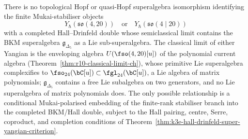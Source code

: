 \begin{proposition}
\label{prop:k3yang-mukai-super-yangian-not-bkm-double}
There is no topological Hopf or quasi-Hopf superalgebra isomorphism
identifying the finite Mukai-stabiliser objects
\[
 Y_\hbar(\mathfrak{so}(4,20))
 \quad\text{or}\quad
 Y_\hbar(\mathfrak{so}(4 \mid 20))
\]
with a completed Hall--Drinfeld double whose semiclassical limit
contains the BKM superalgebra $\mathfrak g_{\Delta_5}$ as a Lie
sub-superalgebra. The classical limit of either Yangian is the
enveloping algebra $U(\fso(4,20)[u])$ of the polynomial current
algebra (Theorem~\ref{thm:r10-classical-limit-ch}), whose primitive
Lie superalgebra complexifies to
$\fso_{24}(\bC[u]) \subset \fgl_{24}(\bC[u])$, a Lie algebra of
matrix polynomials; $\mathfrak g_{\Delta_5}$ contains a free Lie
subalgebra on two generators, and no Lie superalgebra of matrix
polynomials does. The only possible relationship is a conditional
Mukai-polarised embedding of the finite-rank stabiliser branch into the
completed BKM/Hall double, subject to the Hall pairing, centre, Serre,
coproduct, and completion conditions of
Theorem~\ref{thm:k3e-hall-drinfeld-super-yangian-criterion}.
\end{proposition}

